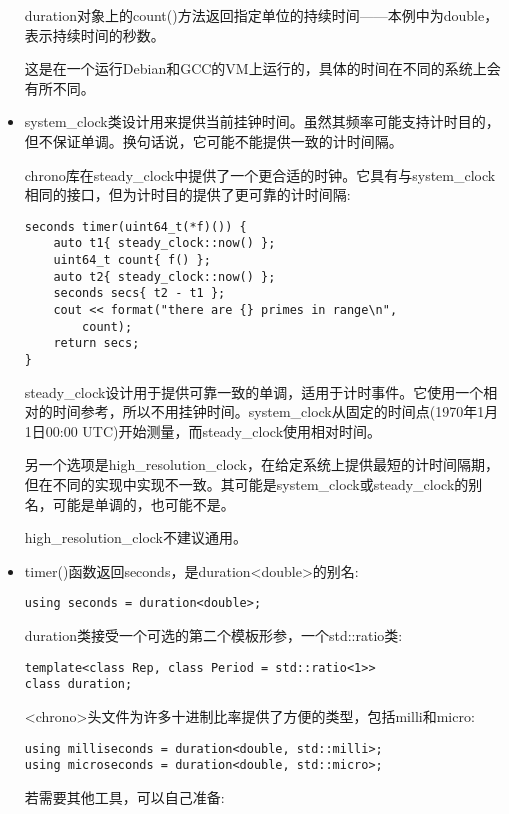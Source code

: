 \begin{itemize}
duration对象上的count()方法返回指定单位的持续时间——本例中为double，表示持续时间的秒数。

这是在一个运行Debian和GCC的VM上运行的，具体的时间在不同的系统上会有所不同。

\item 
system\_clock类设计用来提供当前挂钟时间。虽然其频率可能支持计时目的，但不保证单调。换句话说，它可能不能提供一致的计时间隔。

chrono库在steady\_clock中提供了一个更合适的时钟。它具有与system\_clock相同的接口，但为计时目的提供了更可靠的计时间隔:

\begin{lstlisting}[style=styleCXX]
seconds timer(uint64_t(*f)()) {
	auto t1{ steady_clock::now() };
	uint64_t count{ f() };
	auto t2{ steady_clock::now() };
	seconds secs{ t2 - t1 };
	cout << format("there are {} primes in range\n",
		count);
	return secs;
}
\end{lstlisting}

steady\_clock设计用于提供可靠一致的单调，适用于计时事件。它使用一个相对的时间参考，所以不用挂钟时间。system\_clock从固定的时间点(1970年1月1日00:00 UTC)开始测量，而steady\_clock使用相对时间。

另一个选项是high\_resolution\_clock，在给定系统上提供最短的计时间隔期，但在不同的实现中实现不一致。其可能是system\_clock或steady\_clock的别名，可能是单调的，也可能不是。

high\_resolution\_clock不建议通用。

\item 
timer()函数返回seconds，是duration<double>的别名:

\begin{lstlisting}[style=styleCXX]
using seconds = duration<double>;
\end{lstlisting}

duration类接受一个可选的第二个模板形参，一个std::ratio类:

\begin{lstlisting}[style=styleCXX]
template<class Rep, class Period = std::ratio<1>>
class duration;
\end{lstlisting}

<chrono>头文件为许多十进制比率提供了方便的类型，包括milli和micro:

\begin{lstlisting}[style=styleCXX]
using milliseconds = duration<double, std::milli>;
using microseconds = duration<double, std::micro>;
\end{lstlisting}

若需要其他工具，可以自己准备:


\end{itemize}
